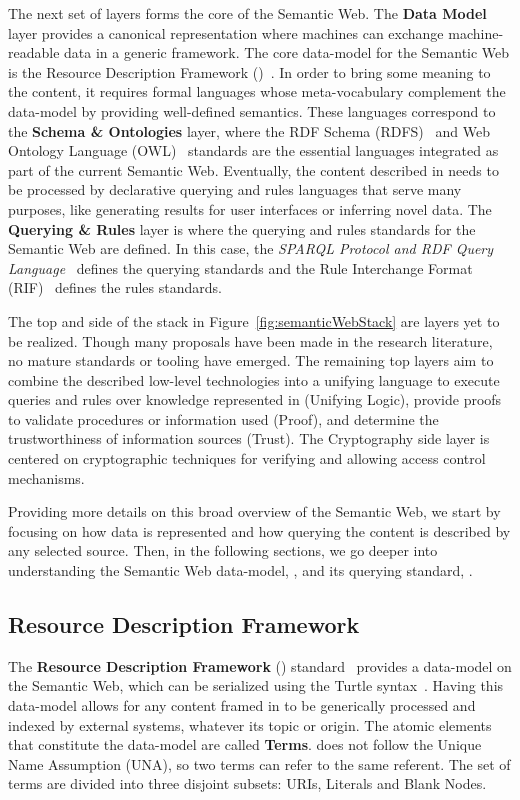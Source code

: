 The next set of layers forms the core of the Semantic Web. The \textbf{Data Model} layer 
provides a canonical representation where machines can exchange machine-readable data in 
a generic framework. The core data-model for the Semantic Web is the Resource Description 
Framework (\RDF{})~\cite{key:rdfprimer}. In order to bring some meaning to the \RDF{} content, 
it requires formal languages whose meta-vocabulary complement the \RDF{} data-model by providing 
well-defined semantics. These languages correspond to the \textbf{Schema \& Ontologies} layer, 
where the RDF Schema (RDFS)~\cite{key:oldrdf} and Web Ontology Language (OWL)~\cite{key:owloverview, key:owl2rationale} 
standards are the essential languages integrated as part of the current Semantic Web. 
Eventually, the content described in \RDF{} needs to be processed by declarative querying 
and rules languages that serve many purposes, like generating results for user interfaces 
or inferring novel \RDF{} data. The \textbf{Querying \& Rules} layer is where the querying 
and rules standards for the Semantic Web are defined. In this case, the \textit{SPARQL Protocol 
and RDF Query Language}~\cite{key:sparql,key:sparql11protocol,key:sparql11} 
defines the querying standards and the Rule Interchange Format (RIF)~\cite{key:rifframework} 
defines the rules standards.

The top and side of the stack in Figure~\ref{fig:semanticWebStack} are layers yet to be realized. Though many 
proposals have been made in the research literature, no mature standards or tooling have 
emerged. The remaining top layers aim to combine the described low-level technologies into 
a unifying language to execute queries and rules over knowledge represented in \RDF{} 
(Unifying Logic), provide proofs to validate procedures or information used (Proof), and 
determine the trustworthiness of information sources (Trust). The Cryptography side layer 
is centered on cryptographic techniques for verifying and allowing access control mechanisms.

Providing more details on this broad overview of the Semantic Web, we start by focusing on 
how data is represented and how querying the content is described by any selected source. 
Then, in the following sections, we go deeper into understanding the Semantic Web data-model, 
\RDF{}, and its querying standard, \SPARQL{}.

\subsection{Resource Description Framework}
\label{cap2:semWeb/rdf}
The \textbf{Resource Description Framework} (\RDF{}) standard~\cite{key:rdfprimer} provides 
a data-model on the Semantic Web, which can be serialized using the Turtle syntax~\cite{key:turtle}. 
Having this data-model allows for any content framed in \RDF{} to be generically processed 
and indexed by external systems, whatever its topic or origin. The atomic elements that 
constitute the \RDF{} data-model are called \textbf{\RDF{} Terms}. \RDF{} does not follow the Unique 
Name Assumption (UNA), so two \RDF{} terms can refer to the same referent. The set of \RDF{} terms 
are divided into three disjoint subsets: URIs, Literals and Blank Nodes.

